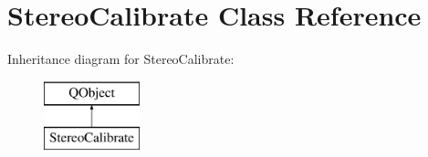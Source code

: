 \hypertarget{class_stereo_calibrate}{}\section{Stereo\+Calibrate Class Reference}
\label{class_stereo_calibrate}
Inheritance diagram for Stereo\+Calibrate\+:\begin{figure}[H]
\begin{center}
\leavevmode
\includegraphics[height=2.000000cm]{class_stereo_calibrate}
\end{center}
\end{figure}
